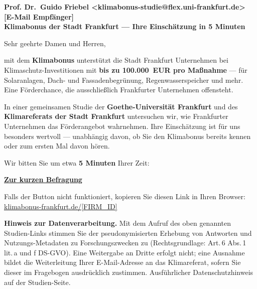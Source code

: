 \documentclass[11pt]{article}
\newcommand{\meta}[2]{%
    \makebox[2.1cm][l]{\color{gugrey}#1}\textbf{#2}\\
}
\newcommand{\firmid}{[FIRM\_ID]}
\newcommand{\persURL}{klimabonus-frankfurt.de/\firmid}
\begin{document}

\begin{tcolorbox}[
    colback=gubg,
    colframe=gubg,
    arc=4pt,
    boxsep=8pt,
    left=10pt, right=10pt, top=4pt, bottom=4pt,
]
\meta{Von:}{Prof. Dr.~Guido Friebel \textcolor{gugrey}{\textless klimabonus-studie@flex.uni-frankfurt.de\textgreater}}
\meta{An:}{[E-Mail Empfänger]}
\meta{Betreff:}{Klimabonus der Stadt Frankfurt --- Ihre Einschätzung in 5 Minuten}
\end{tcolorbox}

\vspace{0.6em}


Sehr geehrte Damen und Herren,

mit dem \textbf{Klimabonus} unterstützt die Stadt Frankfurt Unternehmen
bei Klimaschutz-Investitionen mit \textbf{bis zu 100.000~EUR pro Maßnahme}
--- für Solaranlagen, Dach- und Fassadenbegrünung, Regenwasserspeicher
und mehr. Eine Förderchance, die ausschließlich Frankfurter Unternehmen
offensteht.

In einer gemeinsamen Studie der \textbf{Goethe-Universität Frankfurt} und
des \textbf{Klimareferats der Stadt Frankfurt} untersuchen wir, wie
Frankfurter Unternehmen das Förderangebot wahrnehmen. Ihre Einschätzung
ist für uns besonders wertvoll --- unabhängig davon, ob Sie den
Klimabonus bereits kennen oder zum ersten Mal davon hören.

Wir bitten Sie um etwa \textbf{5 Minuten} Ihrer Zeit:

\vspace{0.2em}

\begin{center}
\colorbox{gublue}{\color{white}\strut\hspace{1.3em}\Large\textbf{\href{https://\persURL}{\color{white}Zur kurzen Befragung}}\hspace{1.3em}\strut}
\end{center}

\vspace{-0.2em}

{\small\textcolor{gugrey}{Falls der Button nicht funktioniert, kopieren Sie
diesen Link in Ihren Browser:}\\
\href{https://\persURL}{\persURL}}

{\small\textbf{Hinweis zur Datenverarbeitung.}
Mit dem Aufruf des oben genannten Studien-Links stimmen Sie der
pseudonymisierten Erhebung von Antworten und Nutzungs-Metadaten zu
Forschungs\-zwecken zu (Rechtsgrundlage: Art.\,6 Abs.\,1 lit.\,a und f
DS-GVO). Eine Weitergabe an Dritte erfolgt nicht; eine Ausnahme bildet
die Weiterleitung Ihrer E-Mail-Adresse an das Klimareferat, sofern Sie
dieser im Fragebogen ausdrücklich zustimmen. Ausführlicher
Datenschutz\-hinweis auf der Studien-Seite.}
\end{document}
